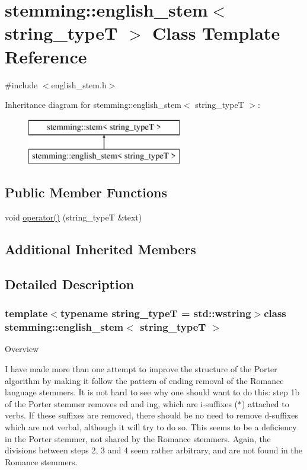 \hypertarget{classstemming_1_1english__stem}{\section{stemming\+:\+:english\+\_\+stem$<$ string\+\_\+type\+T $>$ Class Template Reference}
\label{classstemming_1_1english__stem}
}


{\ttfamily \#include $<$english\+\_\+stem.\+h$>$}

Inheritance diagram for stemming\+:\+:english\+\_\+stem$<$ string\+\_\+type\+T $>$\+:\begin{figure}[H]
\begin{center}
\leavevmode
\includegraphics[height=2.000000cm]{classstemming_1_1english__stem}
\end{center}
\end{figure}
\subsection*{Public Member Functions}
\begin{DoxyCompactItemize}
\item 
void \hyperlink{classstemming_1_1english__stem_a8163a8cc4186b749665d616cbf11c492}{operator()} (string\+\_\+type\+T \&text)
\end{DoxyCompactItemize}
\subsection*{Additional Inherited Members}


\subsection{Detailed Description}
\subsubsection*{template$<$typename string\+\_\+type\+T = std\+::wstring$>$class stemming\+::english\+\_\+stem$<$ string\+\_\+type\+T $>$}

Overview

I have made more than one attempt to improve the structure of the Porter algorithm by making it follow the pattern of ending removal of the Romance language stemmers. It is not hard to see why one should want to do this\+: step 1b of the Porter stemmer removes ed and ing, which are i-\/suffixes ($\ast$) attached to verbs. If these suffixes are removed, there should be no need to remove d-\/suffixes which are not verbal, although it will try to do so. This seems to be a deficiency in the Porter stemmer, not shared by the Romance stemmers. Again, the divisions between steps 2, 3 and 4 seem rather arbitrary, and are not found in the Romance stemmers.

